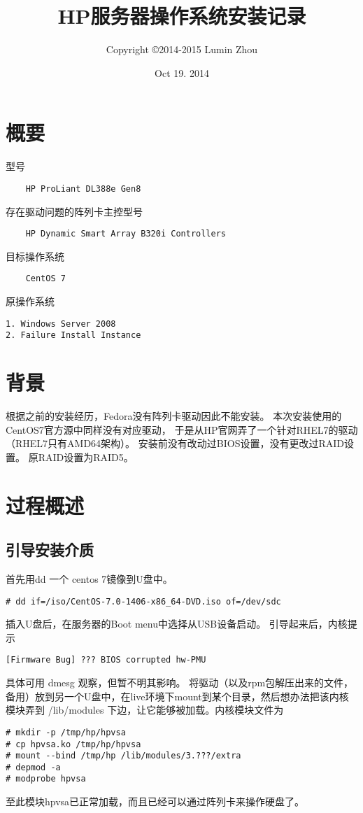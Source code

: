 \documentclass[a4paper,12pt]{article}
\title{HP服务器操作系统安装记录}
\author{Copyright \copyright 2014-2015 Lumin Zhou}
\date{Oct 19. 2014}
\begin{document}
\begin{CJK}{UTF8}{gbsn}

\maketitle

\section{概要}
	型号
	\begin{verbatim}
	HP ProLiant DL388e Gen8
	\end{verbatim}
	存在驱动问题的阵列卡主控型号
	\begin{verbatim}
	HP Dynamic Smart Array B320i Controllers
	\end{verbatim}
	目标操作系统
	\begin{verbatim}
	CentOS 7
	\end{verbatim}
	原操作系统
	\begin{verbatim}
1. Windows Server 2008
2. Failure Install Instance
	\end{verbatim}

\section{背景}
	根据之前的安装经历，Fedora没有阵列卡驱动因此不能安装。
	本次安装使用的CentOS7官方源中同样没有对应驱动，
	于是从HP官网弄了一个针对RHEL7的驱动（RHEL7只有AMD64架构）。
	\newline
	安装前没有改动过BIOS设置，没有更改过RAID设置。
	原RAID设置为RAID5。

\section{过程概述}
	\subsection{引导安装介质}
	首先用dd 一个 centos 7镜像到U盘中。
	\begin{verbatim}
# dd if=/iso/CentOS-7.0-1406-x86_64-DVD.iso of=/dev/sdc
	\end{verbatim}
	插入U盘后，在服务器的Boot menu中选择从USB设备启动。
	\newline
	引导起来后，内核提示
	\begin{verbatim}
[Firmware Bug] ??? BIOS corrupted hw-PMU
	\end{verbatim}
	具体可用 dmesg 观察，但暂不明其影响。
	将驱动（以及rpm包解压出来的文件，备用）放到另一个U盘中，在live环境下mount到某个目录，然后想办法把该内核模块弄到 /lib/modules 下边，让它能够被加载。内核模块文件为
	\begin{verbatim}
# mkdir -p /tmp/hp/hpvsa
# cp hpvsa.ko /tmp/hp/hpvsa
# mount --bind /tmp/hp /lib/modules/3.???/extra
# depmod -a
# modprobe hpvsa
	\end{verbatim}
	至此模块hpvsa已正常加载，而且已经可以通过阵列卡来操作硬盘了。


\end{CJK}
\end{document}
